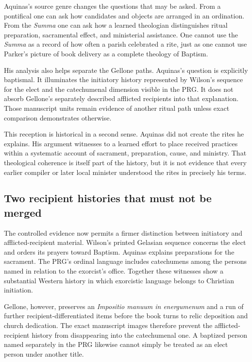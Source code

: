 Aquinas's source genre changes the questions that may be asked. From a
pontifical one can ask how candidates and objects are arranged in an
ordination. From the \emph{Summa} one can ask how a learned theologian
distinguishes ritual preparation, sacramental effect, and ministerial
assistance. One cannot use the \emph{Summa} as a record of how often a parish
celebrated a rite, just as one cannot use Parker's picture of book delivery as
a complete theology of Baptism.

His analysis also helps separate the Gellone paths. Aquinas's question is
explicitly baptismal. It illuminates the initiatory history represented by
Wilson's sequence for the elect and the catechumenal dimension visible in the
PRG. It does not absorb Gellone's separately described afflicted recipients
into that explanation. Those manuscript units remain evidence of another
ritual path unless exact comparison demonstrates otherwise.

This reception is historical in a second sense. Aquinas did not create the
rites he explains. His argument witnesses to a learned effort to place
received practices within a systematic account of sacrament, preparation,
cause, and ministry. That theological coherence is itself part of the
history, but it is not evidence that every earlier compiler or later local
minister understood the rites in precisely his terms.

\subsection{Two recipient histories that must not be merged}

The controlled evidence now permits a firmer distinction between initiatory
and afflicted-recipient material. Wilson's printed Gelasian sequence concerns
the elect and orders its prayers toward Baptism. Aquinas explains preparations
for the sacrament. The PRG's ordinal language includes catechumens among the
persons named in relation to the exorcist's office. Together these witnesses
show a substantial Western history in which exorcistic language belongs to
Christian initiation.

Gellone, however, preserves an \emph{Impositio manuum in energumenum} and a run
of further recipient-differentiated items before the book turns to relic
deposition and church dedication. The exact manuscript images therefore
prevent the afflicted-recipient history from disappearing into the
catechumenal one. A baptized person named separately in the PRG likewise
cannot simply be treated as an elect person under another title.

